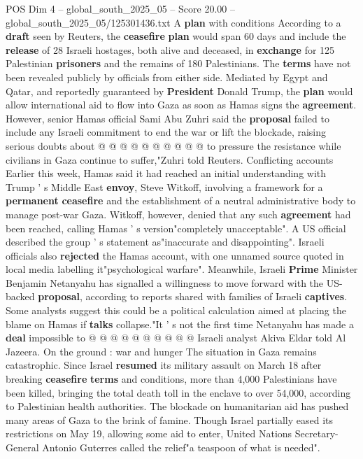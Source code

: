 \begin{textsample}{POS Dim 4 – global\_south\_2025\_05 – Score 20.00 – global\_south\_2025\_05/125301436.txt}
A \textbf{plan} with conditions According to a \textbf{draft} seen by Reuters, the \textbf{ceasefire} \textbf{plan} would span 60 days and include the \textbf{release} of 28 Israeli hostages, both alive and deceased, in \textbf{exchange} for 125 Palestinian \textbf{prisoners} and the remains of 180 Palestinians.
The \textbf{terms} have not been revealed publicly by officials from either side.
Mediated by Egypt and Qatar, and reportedly guaranteed by \textbf{President} Donald Trump, the \textbf{plan} would allow international aid to flow into Gaza as soon as Hamas signs the \textbf{agreement}.
However, senior Hamas official Sami Abu Zuhri said the \textbf{proposal} failed to include any Israeli commitment to end the war or lift the blockade, raising serious doubts about @ @ @ @ @ @ @ @ @ @ to pressure the resistance while civilians in Gaza continue to suffer,"Zuhri told Reuters.
Conflicting accounts Earlier this week, Hamas said it had reached an initial understanding with Trump ' s Middle East \textbf{envoy}, Steve Witkoff, involving a framework for a \textbf{permanent} \textbf{ceasefire} and the establishment of a neutral administrative body to manage post-war Gaza.
Witkoff, however, denied that any such \textbf{agreement} had been reached, calling Hamas ' s version"completely unacceptable".
A US official described the group ' s statement as"inaccurate and disappointing".
Israeli officials also \textbf{rejected} the Hamas account, with one unnamed source quoted in local media labelling it"psychological warfare".
Meanwhile, Israeli \textbf{Prime} Minister Benjamin Netanyahu has signalled a willingness to move forward with the US-backed \textbf{proposal}, according to reports shared with families of Israeli \textbf{captives}.
Some analysts suggest this could be a political calculation aimed at placing the blame on Hamas if \textbf{talks} collapse."It ' s not the first time Netanyahu has made a \textbf{deal} impossible to @ @ @ @ @ @ @ @ @ @ Israeli analyst Akiva Eldar told Al Jazeera.
On the ground : war and hunger The situation in Gaza remains catastrophic.
Since Israel \textbf{resumed} its military assault on March 18 after breaking \textbf{ceasefire} \textbf{terms} and conditions, more than 4,000 Palestinians have been killed, bringing the total death toll in the enclave to over 54,000, according to Palestinian health authorities.
The blockade on humanitarian aid has pushed many areas of Gaza to the brink of famine.
Though Israel partially eased its restrictions on May 19, allowing some aid to enter, United Nations Secretary-General Antonio Guterres called the relief"a teaspoon of what is needed".

\end{textsample}
